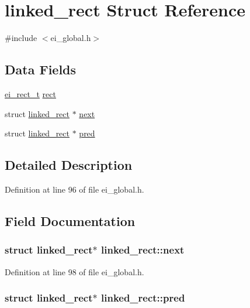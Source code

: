 \hypertarget{structlinked__rect}{
\section{linked\_\-rect Struct Reference}
\label{structlinked__rect}
}


{\ttfamily \#include $<$ei\_\-global.h$>$}\subsection*{Data Fields}
\begin{DoxyCompactItemize}
\item 
\hyperlink{structei__rect__t}{ei\_\-rect\_\-t} \hyperlink{structlinked__rect_a1dfa42b78294e86d12ea8ab4af385fc6}{rect}
\item 
struct \hyperlink{structlinked__rect}{linked\_\-rect} $\ast$ \hyperlink{structlinked__rect_adc5bbc16bfaf8fba66d84cb8d7877d37}{next}
\item 
struct \hyperlink{structlinked__rect}{linked\_\-rect} $\ast$ \hyperlink{structlinked__rect_a0b12117fbdbbf5699f08bc738b83e83c}{pred}
\end{DoxyCompactItemize}


\subsection{Detailed Description}


Definition at line 96 of file ei\_\-global.h.

\subsection{Field Documentation}
\hypertarget{structlinked__rect_adc5bbc16bfaf8fba66d84cb8d7877d37}{
\subsubsection[{next}]{\setlength{\rightskip}{0pt plus 5cm}struct {\bf linked\_\-rect}$\ast$ {\bf linked\_\-rect::next}}}
\label{structlinked__rect_adc5bbc16bfaf8fba66d84cb8d7877d37}


Definition at line 98 of file ei\_\-global.h.\hypertarget{structlinked__rect_a0b12117fbdbbf5699f08bc738b83e83c}{
\subsubsection[{pred}]{\setlength{\rightskip}{0pt plus 5cm}struct {\bf linked\_\-rect}$\ast$ {\bf linked\_\-rect::pred}}}
\label{structlinked__rect_a0b12117fbdbbf5699f08bc738b83e83c}


